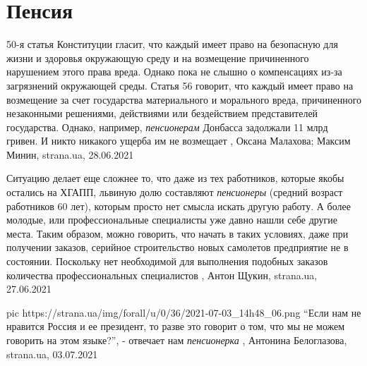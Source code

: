  
 
 
 
 
\chapter{Пенсия}
\label{sec:slova.pensia}

50-я статья Конституции гласит, что каждый имеет право на безопасную для жизни
и здоровья окружающую среду и на возмещение причиненного нарушением этого права
вреда.  Однако пока не слышно о компенсациях из-за загрязнений окружающей
среды.  Статья 56 говорит, что каждый имеет право на возмещение за счет
государства материального и морального вреда, причиненного незаконными
решениями, действиями или бездействием представителей государства.  Однако,
например, \emph{пенсионерам} Донбасса задолжали 11 млрд гривен. И никто
никакого ущерба им не возмещает
, 
Оксана Малахова; Максим Минин, strana.ua, 28.06.2021

Ситуацию делает еще сложнее то, что даже из тех работников, которые якобы
остались на ХГАПП, львиную долю составляют \emph{пенсионеры} (средний возраст
работников 60 лет), которым просто нет смысла искать другую работу. А более
молодые, или профессиональные специалисты уже давно нашли себе другие места.
Таким образом, можно говорить, что начать в таких условиях, даже при получении
заказов, серийное строительство новых самолетов предприятие не в состоянии.
Поскольку нет необходимой для выполнения подобных заказов количества
профессиональных специалистов
, Антон Щукин, strana.ua, 27.06.2021

\ifcmt
  pic https://strana.ua/img/forall/u/0/36/2021-07-03_14h48_06.png
\fi
\enquote{Если нам не нравится Россия и ее президент, то разве это говорит о том, что мы
не можем говорить на этом языке?}, - отвечает нам \emph{пенсионерка}
, 
Антонина Белоглазова, strana.ua, 03.07.2021
